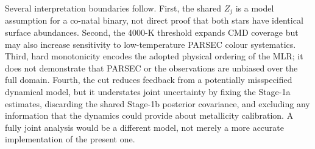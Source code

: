 \FloatBarrier
Several interpretation boundaries follow.  First, the shared $Z_j$ is a model
assumption for a co-natal binary, not direct proof that both stars have identical
surface abundances.  Second, the 4000-K threshold expands CMD coverage but may
also increase sensitivity to low-temperature PARSEC colour systematics.  Third,
hard monotonicity encodes the adopted physical ordering of the MLR; it does not
demonstrate that PARSEC or the observations are unbiased over the full domain.
Fourth, the cut reduces feedback from a potentially misspecified dynamical
model, but it understates joint uncertainty by fixing the Stage-1a estimates,
discarding the shared Stage-1b posterior covariance, and excluding any
information that the dynamics could provide about metallicity calibration.  A
fully joint analysis would be a different model,
not merely a more accurate implementation of the present one.

